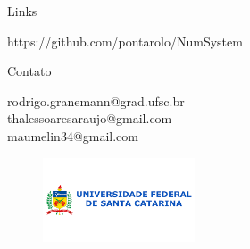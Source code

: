\documentclass[11pt]{beamer}
\begin{document}
\begin{frame}{Links}
    \begin{center}
        https://github.com/pontarolo/NumSystem
    \end{center}
\end{frame}

\begin{frame}{Contato}
    \begin{center}
        \bigskip
        rodrigo.granemann@grad.ufsc.br \\
        thalessoaresaraujo@gmail.com \\
        maumelin34@gmail.com \\
        \begin{figure}[htb]
        \centering
        \includegraphics[width=0.4\textwidth]{imagens/ufsc.png}
    \end{figure}
    \end{center}
\end{frame}
\end{document}
